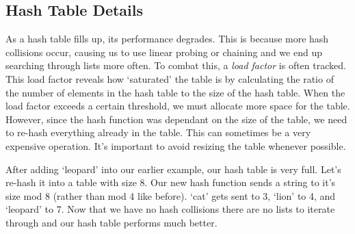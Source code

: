 \subsection*{Hash Table Details}
As a hash table fills up, its performance degrades.
This is because more hash collisions occur, causing us to use linear probing or chaining and we end up searching through lists more often.
To combat this, a \emph{load factor} is often tracked.
This load factor reveals how `saturated' the table is by calculating the ratio of the number of elements in the hash table to the size of the hash table.
When the load factor exceeds a certain threshold, we must allocate more space for the table.
However, since the hash function was dependant on the size of the table, we need to re-hash everything already in the table.
This can sometimes be a very expensive operation.
It's important to avoid resizing the table whenever possible.

After adding `leopard' into our earlier example, our hash table is very full. Let's re-hash it into a table with size 8.
Our new hash function sends a string to it's size mod 8 (rather than mod 4 like before).
`cat' gets sent to 3, `lion' to 4, and `leopard' to 7.
Now that we have no hash collisions there are no lists to iterate through and our hash table performs much better.
\begin{center}
\end{center}

